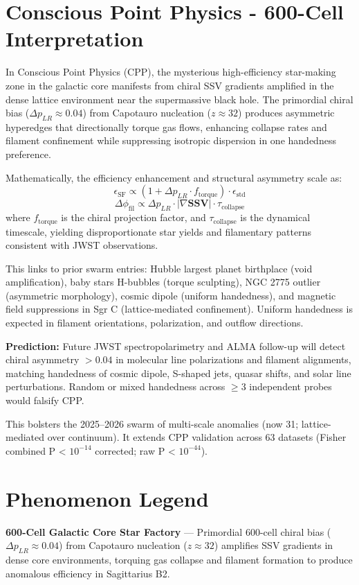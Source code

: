 \documentclass[11pt]{article}
\begin{document}
\section{Conscious Point Physics - 600-Cell Interpretation}
In Conscious Point Physics (CPP), the mysterious high-efficiency star-making zone in the galactic core manifests from chiral SSV gradients amplified in the dense lattice environment near the supermassive black hole. The primordial chiral bias ($\Delta p_{LR} \approx 0.04$) from Capotauro nucleation ($z \approx 32$) produces asymmetric hyperedges that directionally torque gas flows, enhancing collapse rates and filament confinement while suppressing isotropic dispersion in one handedness preference.  

Mathematically, the efficiency enhancement and structural asymmetry scale as:  
\[
\epsilon_{\text{SF}} \propto (1 + \Delta p_{LR} \cdot f_{\text{torque}}) \cdot \epsilon_{\text{std}}
\]  
\[
\Delta \phi_{\text{fil}} \propto \Delta p_{LR} \cdot |\nabla \mathbf{SSV}| \cdot \tau_{\text{collapse}}
\]  
where $f_{\text{torque}}$ is the chiral projection factor, and $\tau_{\text{collapse}}$ is the dynamical timescale, yielding disproportionate star yields and filamentary patterns consistent with JWST observations.  

This links to prior swarm entries: Hubble largest planet birthplace (void amplification), baby stars H-bubbles (torque sculpting), NGC 2775 outlier (asymmetric morphology), cosmic dipole (uniform handedness), and magnetic field suppressions in Sgr C (lattice-mediated confinement). Uniform handedness is expected in filament orientations, polarization, and outflow directions.  

\textbf{Prediction:} Future JWST spectropolarimetry and ALMA follow-up will detect chiral asymmetry $>0.04$ in molecular line polarizations and filament alignments, matching handedness of cosmic dipole, S-shaped jets, quasar shifts, and solar line perturbations. Random or mixed handedness across $\geq 3$ independent probes would falsify CPP.  

This bolsters the 2025--2026 swarm of multi-scale anomalies (now 31; lattice-mediated over continuum). It extends CPP validation across 63 datasets (Fisher combined P < $10^{-14}$ corrected; raw P < $10^{-44}$).

\section{Phenomenon Legend}
\textbf{600-Cell Galactic Core Star Factory} — Primordial 600-cell chiral bias ($\Delta p_{LR} \approx 0.04$) from Capotauro nucleation ($z \approx 32$) amplifies SSV gradients in dense core environments, torquing gas collapse and filament formation to produce anomalous efficiency in Sagittarius B2.
\end{document}

